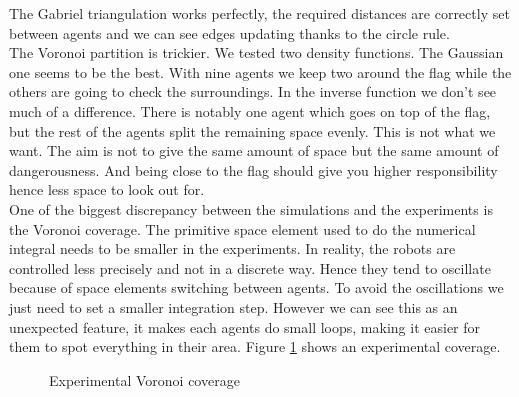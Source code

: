 \documentclass[journal]{IEEEtran}
\begin{document}
The Gabriel triangulation works perfectly, the required distances are correctly set between agents and we can see edges updating thanks to the circle rule.\\

The Voronoi partition is trickier. We tested two density functions. The Gaussian one seems to be the best. With nine agents we keep two around the flag while the others are going to check the surroundings. In the inverse function we don't see much of a difference. There is notably one agent which goes on top of the flag, but the rest of the agents split the remaining space evenly. This is not what we want. The aim is not to give the same amount of space but the same amount of dangerousness. And being close to the flag should give you higher responsibility hence less space to look out for.\\

One of the biggest discrepancy between the simulations and the experiments is the Voronoi coverage. The primitive space element used to do the numerical integral needs to be smaller in the experiments. In reality, the robots are controlled less precisely and not in a discrete way. Hence they tend to oscillate because of space elements switching between agents. To avoid the oscillations we just need to set a smaller integration step. However we can see this as an unexpected feature, it makes each agents do small loops, making it easier for them to spot everything in their area. Figure \ref{vrn_exp} shows an experimental coverage.\\
\begin{figure}
	\centering
	\caption{Experimental Voronoi coverage}
	\label{vrn_exp}
\end{figure}
\end{document}
